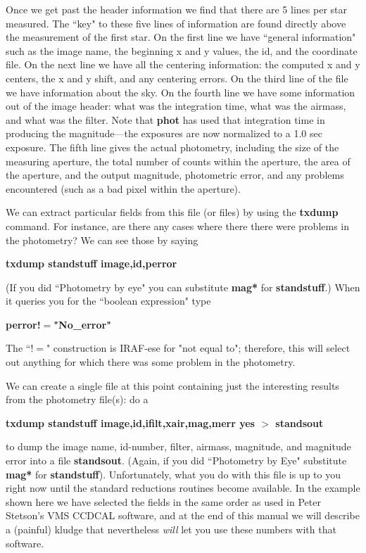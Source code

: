 Once we get past the header information we find that there are 5 lines
per star measured.  The ``key" to these five lines of information are
found directly above the measurement of the first star. On the first
line we have ``general information" such as the
image name, the beginning x and y values, the id,
and the coordinate file.  On the next line we have all the centering
information: the computed x and y centers,
the x and y shift, and any centering errors.  On the third line of the
file we have information about the sky.  On the fourth line we have some
information out of the image header: what was the integration time, what
was the airmass, and what was the filter. Note
that {\bf phot} has used that integration time in producing the
magnitude---the exposures are now normalized to a 1.0 sec exposure.
The fifth line gives the actual photometry, including the size of the
measuring aperture, the total number of counts within the aperture, the
area of the aperture, and the output magnitude, photometric error, and
any problems encountered (such as a bad pixel within the aperture).
 
We can extract particular fields from this file (or files) by using the
{\bf txdump} command.  For instance, are there any cases where there
there were problems in the photometry?  We can see those by saying
 
\centerline{\bf txdump standstuff image,id,perror}
 
\noindent
(If you did ``Photometry by eye" you can substitute {\bf *mag*} for {\bf
standstuff}.)
When it queries you for the ``boolean expression" type
 
\centerline{ {\bf perror!$=$"No\_error"} }
 
\noindent
The ``!$=$" construction is IRAF-ese for "not equal to"; therefore, this
will select out anything for which there was some problem in the
photometry. 
 
We can create a single file at this point containing just the
interesting results from the photometry file(s): do a
 
\centerline{ {\bf txdump standstuff
image,id,ifilt,xair,mag,merr yes $>$ standsout} }
 
\noindent
to dump the image name, id-number, filter, airmass, magnitude,
and magnitude error into a file {\bf standsout}.  (Again, if you did
``Photometry by Eye" substitute {\bf *mag*} for {\bf standstuff}).
Unfortunately, what you do with this file is up to you right now until
the standard reductions routines become available.  In the example shown
here we have selected the fields in the same order as used in Peter
Stetson's VMS CCDCAL software, and at the end of this manual we will
describe a (painful) kludge that nevertheless {\it will} let you use
these numbers with that software. 
 
